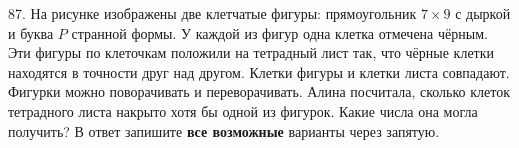 87. На рисунке изображены две клетчатые фигуры: прямоугольник $7\times9$ с дыркой и буква $P$ странной формы. У каждой из фигур одна клетка отмечена чёрным. Эти фигуры по клеточкам положили на тетрадный лист так, что чёрные клетки находятся в точности друг над другом. Клетки фигуры и клетки листа совпадают. Фигурки можно поворачивать и переворачивать. Алина посчитала, сколько клеток тетрадного листа накрыто хотя бы одной из фигурок. Какие числа она могла получить? В ответ запишите {\bf все возможные} варианты через запятую.
\begin{center}
\begin{figure}[ht!]
\end{figure}
\end{center}
